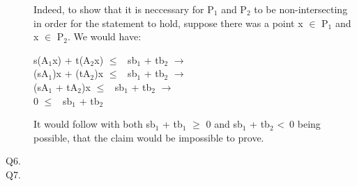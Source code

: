 \documentclass[10pt]{csc_assignment}
\begin{document}
\begin{description}
Indeed, to show that it is neccessary for P$_{1}$ and P$_{2}$ to be non-intersecting in order for the statement to hold, suppose there was a point x $\in$ P$_{1}$ and x $\in$ P$_{2}$. We would have:\\   
\hspace*{1cm}\parbox{16cm}{s(A$_{1}$x) + t(A$_{2}$x) $\leqslant$ ~sb$_{1}$ + tb$_{2}$ $\rightarrow$\\
(sA$_{1}$)x + (tA$_{2}$)x $\leqslant$ ~sb$_{1}$ + tb$_{2}$ $\rightarrow$\\
(sA$_{1}$ + tA$_{2}$)x $\leqslant$ ~sb$_{1}$ + tb$_{2}$ $\rightarrow$\\
0 $\leqslant$ ~sb$_{1}$ + tb$_{2}$\\
}
It would follow with both sb$_{1}$ + tb$_{1}$ $\geqslant$ 0 and sb$_{1}$ + tb$_{2}$ \textless ~0 being possible, that the claim would be impossible to prove.


\newpage
\item[Q6.]



\newpage
\item[Q7.]


\end{description}
\end{document}
